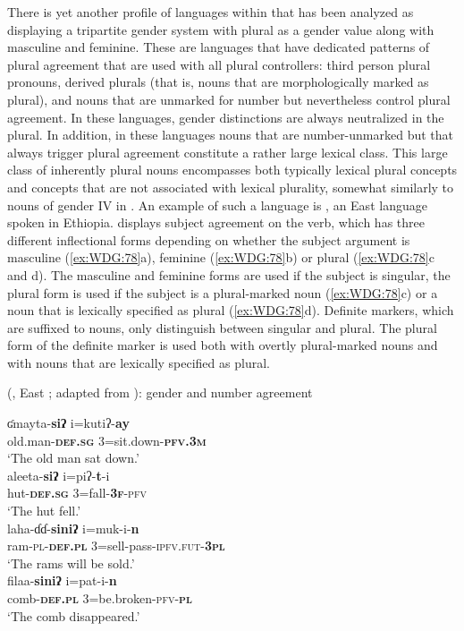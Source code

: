 \documentclass[output=collectionpaper]{langsci/langscibook}
\begin{document}
There is yet another profile of languages within  that has been analyzed as displaying a tripartite gender system with plural as a gender value along with masculine and feminine. These are languages that have dedicated patterns of plural agreement that are used with all plural controllers: third person plural pronouns, derived plurals (that is, nouns that are morphologically marked as plural), and nouns that are unmarked for number but nevertheless control plural agreement. In these languages, gender distinctions are always neutralized in the plural. In addition, in these languages nouns that are number-unmarked but that always trigger plural agreement constitute a rather large lexical class. This large class of inherently plural nouns encompasses both typically lexical plural concepts and concepts that are not associated with lexical plurality, somewhat similarly to nouns of gender IV in . An example of such a language is , an East  language spoken in Ethiopia.  displays subject agreement on the verb, which has three different inflectional forms depending on whether the subject argument is masculine (\ref{ex:WDG:78}a), feminine (\ref{ex:WDG:78}b) or plural (\ref{ex:WDG:78}c and d). The masculine and feminine forms are used if the subject is singular, the plural form is used if the subject is a plural-marked noun (\ref{ex:WDG:78}c) or a noun that is lexically specified as plural (\ref{ex:WDG:78}d). Definite markers, which are suffixed to nouns, only distinguish between singular and plural. The plural form of the definite marker is used both with overtly plural-marked nouns and with nouns that are lexically specified as plural.

\ea\label{ex:WDG:78}
 (, East ; adapted from \citealt[36--37]{Tsegaye2017}): gender and number agreement\\
\begin{xlist}
\ex
\gll 	ʛmayta-\textbf{siʔ} 	i=kutiʔ-\textbf{ay}\\
old.man-\textbf{\textsc{def.sg}} 	3=sit.down-\textbf{\textsc{pfv.3m}} \\
\glt	`The old man sat down.' \\
\ex
\gll	aleeta-\textbf{siʔ} 	i=piʔ-\textbf{t}-i \\
hut-\textbf{\textsc{def.sg}}	3=fall-\textsc{\textbf{3f}-pfv} \\
\glt	`The hut fell.' \\
\ex
\gll 	laha-ɗɗ-\textbf{siniʔ} 	i=muk-i-\textbf{n} \\
ram-\textsc{pl-\textbf{def.pl}} 	3=sell-pass-\textsc{ipfv.fut-\textbf{3pl}} \\
\glt	`The rams will be sold.' \\
\ex
\gll	filaa-\textbf{siniʔ} 	i=pat-i-\textbf{n}\\
comb-\textbf{\textsc{def.pl}} 	3=be.broken-\textsc{pfv-\textbf{pl}} \\
\glt	`The comb disappeared.' \\
\end{xlist}
\z
\end{document}
